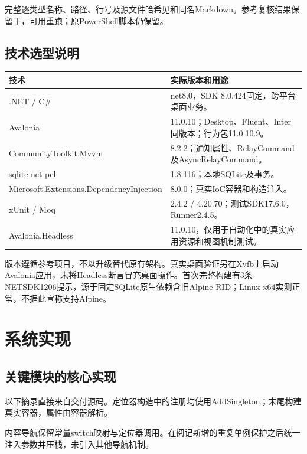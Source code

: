 \documentclass[UTF8,a4paper,11pt,fontset=none]{ctexart}
\begin{document}
完整逐类型名称、路径、行号及源文件哈希见和同名Markdown。参考复核结果保留于，可用重跑；原PowerShell脚本仍保留。
\subsection{技术选型说明}
\begin{longtable}{p{52mm}p{87mm}}\toprule 技术 & 实际版本和用途\\\midrule
.NET / C\# & net8.0，SDK 8.0.424固定，跨平台桌面业务。\\
Avalonia & 11.0.10；Desktop、Fluent、Inter同版本；行为包11.0.10.9。\\
CommunityToolkit.Mvvm & 8.2.2；通知属性、RelayCommand及AsyncRelayCommand。\\
sqlite-net-pcl & 1.8.116；本地SQLite及事务。\\
Microsoft.Extensions.\newline DependencyInjection & 8.0.0；真实IoC容器和构造注入。\\
xUnit / Moq & 2.4.2 / 4.20.70；测试SDK17.6.0，Runner2.4.5。\\
Avalonia.Headless & 11.0.10，仅用于自动化中的真实应用资源和视图机制测试。\\\bottomrule
\end{longtable}

版本遵循参考项目，不以升级替代原有架构。真实桌面验证另在Xvfb上启动Avalonia应用，未将Headless断言冒充桌面操作。首次完整构建有3条NETSDK1206提示，源于固定SQLite原生依赖含旧Alpine RID；Linux x64实测正常，不据此宣称支持Alpine。
\section{系统实现}
\subsection{关键模块的核心实现}
以下摘录直接来自交付源码。定位器构造中的注册均使用AddSingleton；末尾构建真实容器，属性由容器解析。

内容导航保留常量switch映射与定位器调用。在阅记新增的重复单例保护之后统一注入参数并压栈，未引入其他导航机制。
\end{document}
